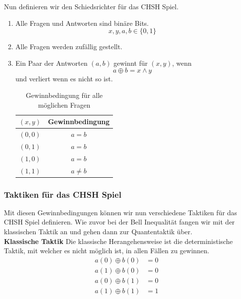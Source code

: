 Nun definieren wir den Schiedsrichter für das CHSH Spiel.
\begin{enumerate}
    \item Alle Fragen und Antworten sind binäre Bits.
    \begin{equation}
        x, y, a, b \in \{0, 1\}
    \end{equation}
    \item Alle Fragen werden zufällig gestellt.
    \item Ein Paar der Antworten $(a, b)$ gewinnt für $(x, y)$, wenn
    \begin{equation}
        a \oplus b = x \land y
    \end{equation}
    und verliert wenn es nicht so ist.
    \begin{table}[H]
        \centering
        \begin{tabular}{c|c}
            $(x, y)$ & Gewinnbedingung \\ \hline
            $(0, 0)$ & $a = b$ \\ \hline
            $(0, 1)$ & $a = b$ \\ \hline
            $(1, 0)$ & $a = b$ \\ \hline
            $(1, 1)$ & $a \neq b$ \\
        \end{tabular}
        \caption{Gewinnbedingung für alle möglichen Fragen}
        \label{tab:CHSHWinCondition}
    \end{table}
\end{enumerate}

\subsubsection{Taktiken für das CHSH Spiel}
\label{subsubsec:chsh_taktiken}

Mit diesen Gewinnbedingungen können wir nun verschiedene Taktiken für das CHSH Spiel definieren.
Wie zuvor bei der Bell Inequalität fangen wir mit der klassischen Taktik an und gehen dann zur Quantentaktik über.\\

\textbf{Klassische Taktik}
Die klassische Herangehensweise ist die deterministische Taktik, mit welcher es nicht möglich ist, in allen Fällen zu gewinnen.
\begin{align}
    a(0) \oplus b(0) &= 0 \\
    a(1) \oplus b(0) &= 0 \\
    a(0) \oplus b(1) &= 0 \\
    a(1) \oplus b(1) &= 1
\end{align}

